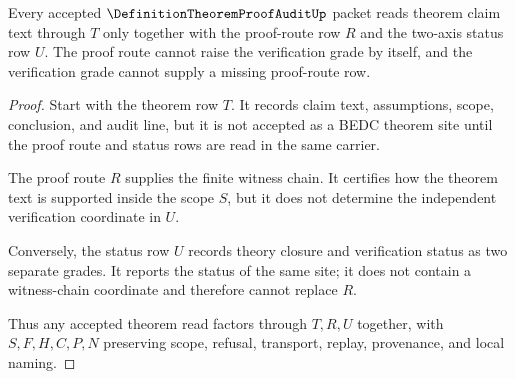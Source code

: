 \begin{theorem}
\label{thm:definition-theorem-proof-audit-axis-and-proof-route}
Every accepted $\DefinitionTheoremProofAuditUp$ packet reads theorem claim text through $T$ only together with the proof-route row $R$ and the two-axis status row $U$. The proof route cannot raise the verification grade by itself, and the verification grade cannot supply a missing proof-route row.
\end{theorem}
\begin{proof}
Start with the theorem row $T$. It records claim text, assumptions, scope, conclusion, and audit line, but it is not accepted as a BEDC theorem site until the proof route and status rows are read in the same carrier.

The proof route $R$ supplies the finite witness chain. It certifies how the theorem text is supported inside the scope $S$, but it does not determine the independent verification coordinate in $U$.

Conversely, the status row $U$ records theory closure and verification status as two separate grades. It reports the status of the same site; it does not contain a witness-chain coordinate and therefore cannot replace $R$.

Thus any accepted theorem read factors through $T,R,U$ together, with $S,F,H,C,P,N$ preserving scope, refusal, transport, replay, provenance, and local naming.
\end{proof}


